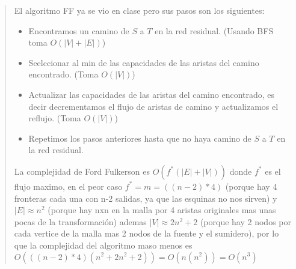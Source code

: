 \begin{quote}
    El algoritmo FF ya se vio en clase pero sus pasos son los siguientes: \vspace{.2cm}
    \begin{itemize}
        \item Encontramos un camino de $S$ a $T$ en la red residual. (Usando BFS toma $O(|V|+|E|)$)
        \item Seelccionar al min de las capacidades de las aristas del camino encontrado. (Toma $O(|V|)$)
        \item Actualizar las capacidades de las aristas del camino encontrado, es decir decrementamos el flujo de aristas de camino y actualizamos el reflujo. (Toma $O(|V|)$)
        \item Repetimos los pasos anteriores hasta que no haya camino de $S$ a $T$ en la red residual. 
    \end{itemize}

    La complejidad de Ford Fulkerson es $O(f^*(|E|+|V|))$ donde $f^*$ es el flujo maximo, en el peor caso $f^* = m = ((n-2)*4)$ (porque hay 4 fronteras cada una con n-2 salidas, ya que las esquinas no nos sirven) y $|E| \approx n^2$ (porque hay nxn en la malla por 4 aristas originales mas unas pocas de la transformación) ademas $|V| \approx 2n^2+2$ (porque hay 2 nodos por cada vertice de la malla mas 2 nodos de la fuente y el sumidero), por lo que la complejidad del algoritmo maso menos es $O(((n-2)*4)(n^2+2n^2+2)) = O(n (n^2)) = O(n^3)$
\end{quote}